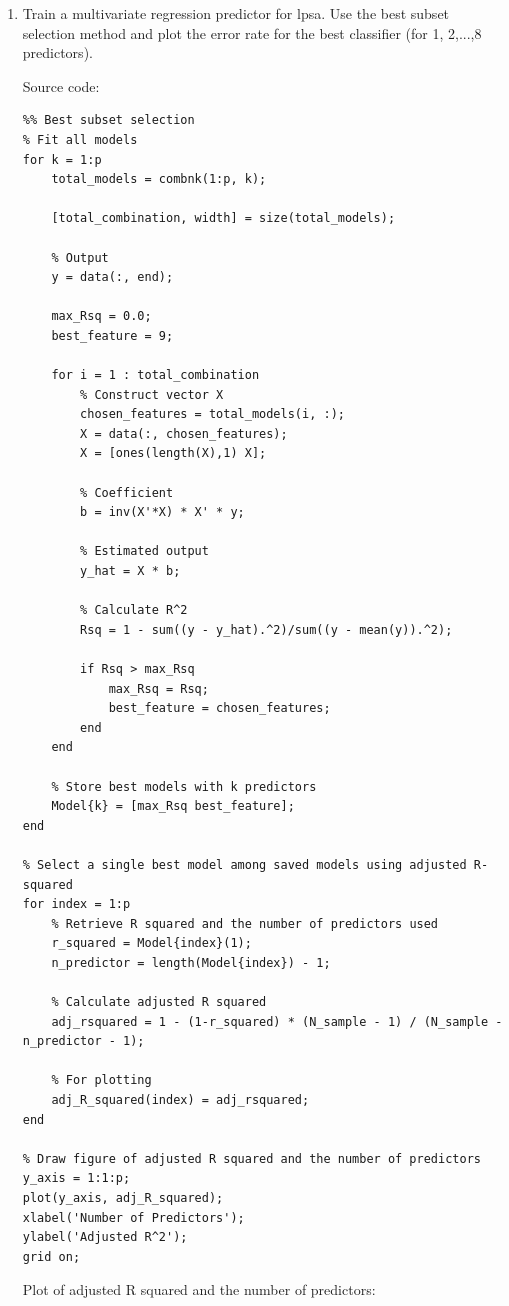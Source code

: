 \documentclass[12pt]{article}
\begin{document}
\begin{enumerate}[label=\alph*)]
    \item Train a multivariate regression predictor for lpsa. Use the best subset selection method and plot the error rate for the best classifier (for 1, 2,...,8 predictors).
    
    Source code:
    
    \begin{lstlisting}
%% Best subset selection
% Fit all models
for k = 1:p
    total_models = combnk(1:p, k);
    
    [total_combination, width] = size(total_models);
    
    % Output
    y = data(:, end);
    
    max_Rsq = 0.0;
    best_feature = 9;
    
    for i = 1 : total_combination     
        % Construct vector X
        chosen_features = total_models(i, :);
        X = data(:, chosen_features);
        X = [ones(length(X),1) X];
        
        % Coefficient
        b = inv(X'*X) * X' * y;
        
        % Estimated output
        y_hat = X * b;
                
        % Calculate R^2
        Rsq = 1 - sum((y - y_hat).^2)/sum((y - mean(y)).^2);
        
        if Rsq > max_Rsq
            max_Rsq = Rsq;
            best_feature = chosen_features;
        end     
    end
    
    % Store best models with k predictors
    Model{k} = [max_Rsq best_feature];
end

% Select a single best model among saved models using adjusted R-squared
for index = 1:p
    % Retrieve R squared and the number of predictors used
    r_squared = Model{index}(1);
    n_predictor = length(Model{index}) - 1;
    
    % Calculate adjusted R squared
    adj_rsquared = 1 - (1-r_squared) * (N_sample - 1) / (N_sample - n_predictor - 1);
    
    % For plotting
    adj_R_squared(index) = adj_rsquared;
end

% Draw figure of adjusted R squared and the number of predictors
y_axis = 1:1:p;
plot(y_axis, adj_R_squared);
xlabel('Number of Predictors');
ylabel('Adjusted R^2');
grid on;
    \end{lstlisting}
    
   Plot of adjusted R squared and the number of predictors:
    

\end{enumerate}
\end{document}
